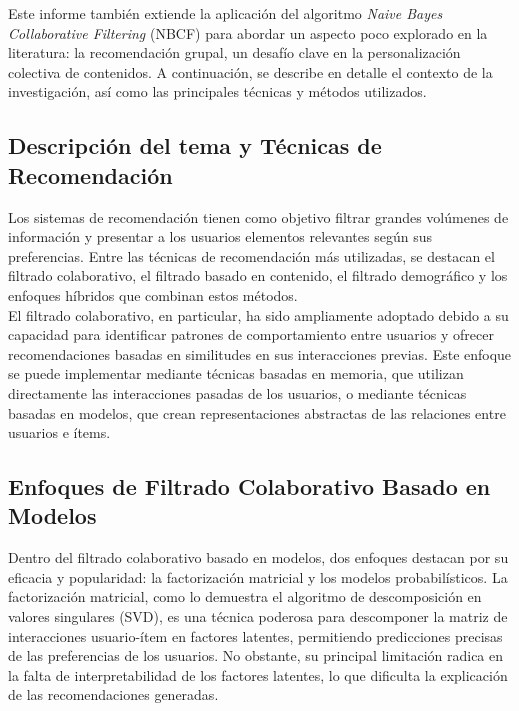 \documentclass[runningheads,a4paper]{llncs}
\begin{document}
Este informe también extiende la aplicación del algoritmo \textit{Naive Bayes Collaborative Filtering} (NBCF) para abordar un aspecto poco explorado en la literatura: la recomendación grupal, un desafío clave en la personalización colectiva de contenidos. A continuación, se describe en detalle el contexto de la investigación, así como las principales técnicas y métodos utilizados.

\subsection{Descripción del tema y Técnicas de Recomendación}

Los sistemas de recomendación tienen como objetivo 
filtrar grandes 
volúmenes de información y presentar a los usuarios 
elementos relevantes según sus preferencias. 
Entre las técnicas de recomendación más utilizadas, 
se destacan el filtrado colaborativo, el filtrado 
basado en contenido, el filtrado demográfico y los enfoques híbridos que 
combinan estos métodos.\\

El filtrado colaborativo, en particular, 
ha sido ampliamente adoptado debido a su capacidad 
para identificar patrones de comportamiento entre 
usuarios y ofrecer recomendaciones basadas en 
similitudes en sus interacciones previas. 
Este enfoque se puede implementar mediante técnicas 
basadas en memoria, que utilizan directamente las 
interacciones pasadas de los usuarios, o mediante 
técnicas basadas en modelos, que crean representaciones 
abstractas de las relaciones entre usuarios e ítems.

\subsection{Enfoques de Filtrado Colaborativo Basado en Modelos}

Dentro del filtrado colaborativo basado en modelos, 
dos enfoques destacan por su eficacia y popularidad: 
la factorización matricial y los modelos probabilísticos. 
La factorización matricial, como lo demuestra el 
algoritmo de descomposición en valores singulares (SVD), 
es una técnica poderosa para descomponer la matriz de 
interacciones usuario-ítem en factores latentes, 
permitiendo predicciones precisas de las preferencias 
de los usuarios. No obstante, su principal limitación 
radica en la falta de interpretabilidad de los factores 
latentes, lo que dificulta la explicación de las 
recomendaciones generadas.\\
\end{document}
